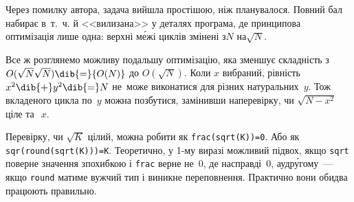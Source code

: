 {\ifAfour
{}
Через помилку автора, задача вийшла простішою, ніж планувалося. Повний бал набирає в~т.~ч. й <<вилизана>> у деталях програма, де принципова оптимізація лише одна: верхні м\'{е}жі циклів змінені з\nolinebreak[3] $N$ на\nolinebreak[3] $\sqrt{N}$.
\else
{}
\fi

}

Все ж розглянемо можливу подальшу оптимізацію, яка зменшує складність з ${O(\sqrt{N}{\*}\sqrt{N})}\dib{{=}}{O(N)}$ до $O(\sqrt{N})$. Коли $x$ вибраний, рівність $x^2\dib{{+}}y^2\dib{{=}}N$ не~може виконатися для різних натуральних~$y$. Тож вкладеного цикла по~$y$ можна позбутися, замінивши на\nolinebreak[3] перевірку, чи $\sqrt{N{-}x^2}$ ціле та~${\>}x$.

\label{text:how-to-test-if-sqrt-N-integer}
Перевірку, чи $\sqrt{K}$ цілий, можна робити як \verb"frac(sqrt(K))=0". Або як \verb"sqr(round(sqrt(K)))=K". Теоретично, у \mbox{1-му} виразі можливий підвох, якщо \texttt{sqrt} поверне значення з\nolinebreak[3] похибкою і \texttt{frac} верне не~0, де насправді~0, а\nolinebreak[3] у\nolinebreak[3] др\'{у}гому~--- якщо \texttt{round} матиме вужчий тип і виникне переповнення. Практично вони обидва працюють правильно.